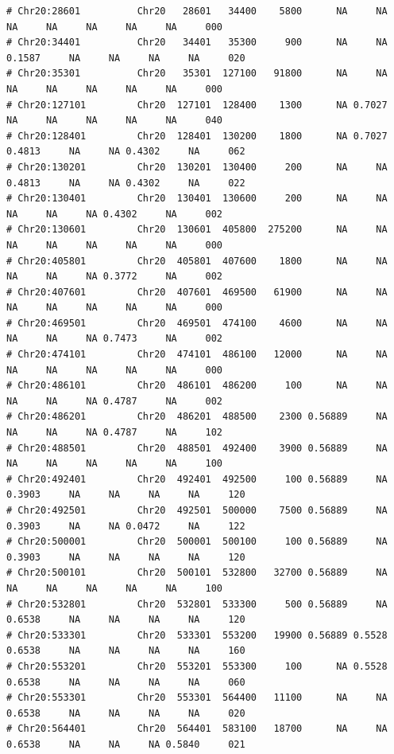 \documentclass{article}\usepackage[]{graphicx}\usepackage[]{color}
\makeatletter
\newenvironment{kframe}{%
 \def\at@end@of@kframe{}%
 \ifinner\ifhmode%
  \def\at@end@of@kframe{\end{minipage}}%
  \begin{minipage}{\columnwidth}%
 \fi\fi%
 \def\FrameCommand##1{\hskip\@totalleftmargin \hskip-\fboxsep
 \colorbox{shadecolor}{##1}\hskip-\fboxsep
     \hskip-\linewidth \hskip-\@totalleftmargin \hskip\columnwidth}%
 \MakeFramed {\advance\hsize-\width
   \@totalleftmargin\z@ \linewidth\hsize
   \@setminipage}}%
 {\par\unskip\endMakeFramed%
 \at@end@of@kframe}
\newenvironment{knitrout}{}{} %
\makeatother
\begin{document}
\begin{knitrout}
\begin{kframe}
\begin{verbatim}
# Chr20:28601          Chr20   28601   34400    5800      NA     NA     NA     NA     NA     NA     NA     000
# Chr20:34401          Chr20   34401   35300     900      NA     NA 0.1587     NA     NA     NA     NA     020
# Chr20:35301          Chr20   35301  127100   91800      NA     NA     NA     NA     NA     NA     NA     000
# Chr20:127101         Chr20  127101  128400    1300      NA 0.7027     NA     NA     NA     NA     NA     040
# Chr20:128401         Chr20  128401  130200    1800      NA 0.7027 0.4813     NA     NA 0.4302     NA     062
# Chr20:130201         Chr20  130201  130400     200      NA     NA 0.4813     NA     NA 0.4302     NA     022
# Chr20:130401         Chr20  130401  130600     200      NA     NA     NA     NA     NA 0.4302     NA     002
# Chr20:130601         Chr20  130601  405800  275200      NA     NA     NA     NA     NA     NA     NA     000
# Chr20:405801         Chr20  405801  407600    1800      NA     NA     NA     NA     NA 0.3772     NA     002
# Chr20:407601         Chr20  407601  469500   61900      NA     NA     NA     NA     NA     NA     NA     000
# Chr20:469501         Chr20  469501  474100    4600      NA     NA     NA     NA     NA 0.7473     NA     002
# Chr20:474101         Chr20  474101  486100   12000      NA     NA     NA     NA     NA     NA     NA     000
# Chr20:486101         Chr20  486101  486200     100      NA     NA     NA     NA     NA 0.4787     NA     002
# Chr20:486201         Chr20  486201  488500    2300 0.56889     NA     NA     NA     NA 0.4787     NA     102
# Chr20:488501         Chr20  488501  492400    3900 0.56889     NA     NA     NA     NA     NA     NA     100
# Chr20:492401         Chr20  492401  492500     100 0.56889     NA 0.3903     NA     NA     NA     NA     120
# Chr20:492501         Chr20  492501  500000    7500 0.56889     NA 0.3903     NA     NA 0.0472     NA     122
# Chr20:500001         Chr20  500001  500100     100 0.56889     NA 0.3903     NA     NA     NA     NA     120
# Chr20:500101         Chr20  500101  532800   32700 0.56889     NA     NA     NA     NA     NA     NA     100
# Chr20:532801         Chr20  532801  533300     500 0.56889     NA 0.6538     NA     NA     NA     NA     120
# Chr20:533301         Chr20  533301  553200   19900 0.56889 0.5528 0.6538     NA     NA     NA     NA     160
# Chr20:553201         Chr20  553201  553300     100      NA 0.5528 0.6538     NA     NA     NA     NA     060
# Chr20:553301         Chr20  553301  564400   11100      NA     NA 0.6538     NA     NA     NA     NA     020
# Chr20:564401         Chr20  564401  583100   18700      NA     NA 0.6538     NA     NA     NA 0.5840     021

\end{verbatim}
\end{kframe}
\end{knitrout}
\end{document}
